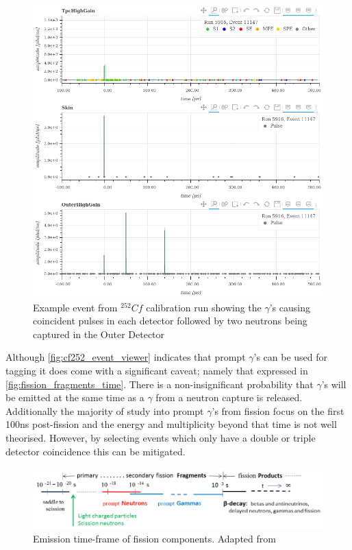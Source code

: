 \begin{figure}[!htbp]
\includegraphics[width=\textwidth]{Figures/NeutronCaptureTime/cf252_eventviewer_5916.png}
\centering
\caption{Example event from ${}^{252}{Cf}$ calibration run showing the $\gamma$'s causing coincident pulses in each detector followed by two neutrons being captured in the Outer Detector}
\label{fig:cf252_event_viewer}
\end{figure}

\par
Although \autoref{fig:cf252_event_viewer} indicates that prompt $\gamma$'s can be used for tagging it does come with a significant caveat; namely that expressed in \autoref{fig:fission_fragments_time}.
There is a non-insignificant probability that $\gamma$'s will be emitted at the same time as a $\gamma$ from a neutron capture is released.
Additionally the majority of study into prompt $\gamma$'s from fission focus on the first 100ns post-fission and the energy and multiplicity beyond that time is not well theorised. 
However, by selecting events which only have a double or triple detector coincidence this can be mitigated.


\begin{figure}[!htbp]
\includegraphics[width=13cm]{Figures/NeutronCaptureTime/fission_fragment_times.png}
\centering
\caption{Emission time-frame of fission components. Adapted from \cite{cf252_fission_ref}}
\label{fig:fission_fragments_time}
\end{figure}

